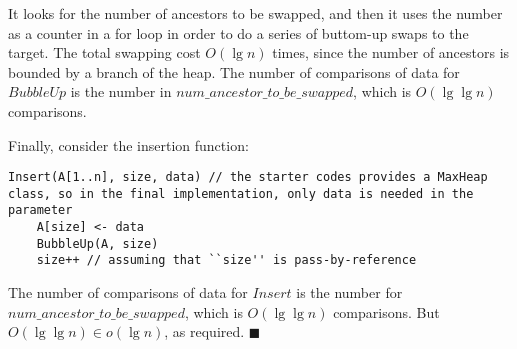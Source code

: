\documentclass[12pt]{article}
\begin{document}
It looks for the number of ancestors to be swapped, and then it uses the number as a counter in a for loop in order to do a series of buttom-up swaps to the target.
The total swapping cost $O(\lg n)$ times, since the number of ancestors is bounded by a branch of the heap. 
The number of comparisons of data for $BubbleUp$ is the number in $num\_ancestor\_to\_be\_swapped$, which is $O(\lg\lg n)$ comparisons.

Finally, consider the insertion function:
\begin{lstlisting}
Insert(A[1..n], size, data) // the starter codes provides a MaxHeap class, so in the final implementation, only data is needed in the parameter
	A[size] <- data
	BubbleUp(A, size)
	size++ // assuming that ``size'' is pass-by-reference
\end{lstlisting}
The number of comparisons of data for $Insert$ is the number for $num\_ancestor\_to\_be\_swapped$, which is $O(\lg\lg n)$ comparisons.
But $O(\lg\lg n) \in o(\lg n)$, as required.
\hfill $\blacksquare$
\end{document}
